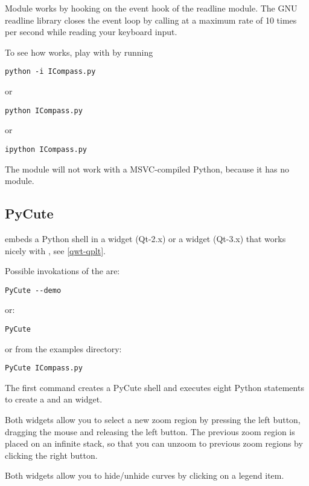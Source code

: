\documentclass{manual}
\begin{document}
Module  works by hooking  on the
event hook of the readline module.
The GNU readline library closes the event loop by calling 
 at a maximum rate of 10 times per second
while reading your keyboard input.

To see how  works, play with  by running
\begin{verbatim}
python -i ICompass.py
\end{verbatim}
or
\begin{verbatim}
python ICompass.py
\end{verbatim}
or
\begin{verbatim}
ipython ICompass.py
\end{verbatim}


\begin{notice}[warning]
  The module  will not work with a MSVC-compiled Python, because
  it has no  module.
\end{notice}


\subsection{PyCute \label{pycute-intro}}

 embeds a Python shell in a  widget
(Qt-2.x) or a  widget (Qt-3.x) that works nicely with
, see \ref{qwt-qplt}.

Possible invokations of the  are:
\begin{verbatim}
PyCute --demo
\end{verbatim}
or:
\begin{verbatim}
PyCute
\end{verbatim}
or from the examples directory:
\begin{verbatim}
PyCute ICompass.py
\end{verbatim}

The first command creates a PyCute shell and executes eight Python statements
to create a  and an  widget.

Both widgets allow you to select a new zoom region by pressing the left button,
dragging the mouse and releasing the left button.
The previous zoom region is placed on an infinite stack, so that you can
unzoom to previous zoom regions by clicking the right button.

Both widgets allow you to hide/unhide curves by clicking on a legend item.
\end{document}
